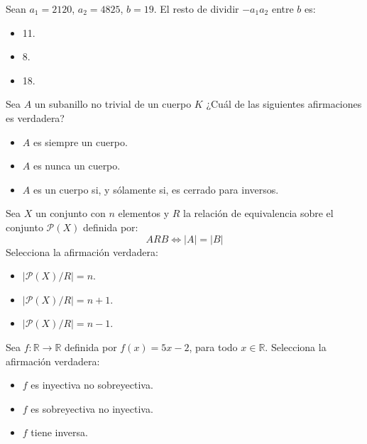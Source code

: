 \documentclass[12pt]{article}
\begin{document}
    \begin{ejercicio}
        Sean $a_1 = 2120$, $a_2 = 4825$, $b = 19$. El resto de dividir $-a_1a_2$ entre $b$ es:
        \begin{itemize}
            \item 11.
            \item 8.
            \item 18.
        \end{itemize}
    \end{ejercicio}

    \begin{ejercicio}
       Sea $A$ un subanillo no trivial de un cuerpo $K$ ¿Cuál de las siguientes afirmaciones es verdadera? 
        \begin{itemize}
            \item $A$ es siempre un cuerpo.
            \item $A$ es nunca un cuerpo.
            \item $A$ es un cuerpo si, y sólamente si, es cerrado para inversos.
        \end{itemize}
    \end{ejercicio}

    \begin{ejercicio}
        Sea $X$ un conjunto con $n$ elementos y $R$ la relación de equivalencia sobre el conjunto $\mathcal{P}(X)$ definida por:
        $$A R B \Leftrightarrow |A| = |B|$$
        Selecciona la afirmación verdadera:
        \begin{itemize}
            \item $|\mathcal{P}(X)/R| = n$.
            \item $|\mathcal{P}(X)/R| = n+1$.
            \item $|\mathcal{P}(X)/R| = n-1$.
        \end{itemize}
    \end{ejercicio}

    \begin{ejercicio}
        Sea $f:\mathbb{R} \rightarrow \mathbb{R}$ definida por $f(x) = 5x -2$, para todo $x \in \mathbb{R}$. Selecciona la afirmación verdadera:
        \begin{itemize}
            \item $f$ es inyectiva no sobreyectiva.
            \item $f$ es sobreyectiva no inyectiva.
            \item $f$ tiene inversa.
        \end{itemize}
    \end{ejercicio}
\end{document}
